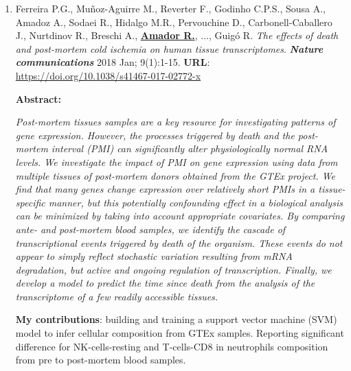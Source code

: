 \begin{enumerate}
\item Ferreira P.G., Muñoz-Aguirre M., Reverter F., Godinho C.P.S., Sousa A., Amadoz A., Sodaei R., Hidalgo  M.R., Pervouchine D., Carbonell-Caballero J., Nurtdinov R., Breschi A., \textbf{\underline{Amador R.}}, ..., Guigó R. \textit{The effects of death and post-mortem cold ischemia on human tissue transcriptomes}. \textit{\textbf{Nature communications}} 2018 Jan; 9(1):1-15. \newline\newline
\textbf{URL}: \url{https://doi.org/10.1038/s41467-017-02772-x}  
\begin{center}
\textbf{Abstract:}
\end{center}
\textit{Post-mortem tissues samples are a key resource for investigating patterns of gene expression. However, the processes triggered by death and the post-mortem interval (PMI) can significantly alter physiologically normal RNA levels. We investigate the impact of PMI on gene expression using data from multiple tissues of post-mortem donors obtained from the GTEx project. We find that many genes change expression over relatively short PMIs in a tissue-specific manner, but this potentially confounding effect in a biological analysis can be minimized by taking into account appropriate covariates. By comparing ante- and post-mortem blood samples, we identify the cascade of transcriptional events triggered by death of the organism. These events do not appear to simply reflect stochastic variation resulting from mRNA degradation, but active and ongoing regulation of transcription. Finally, we develop a model to predict the time since death from the analysis of the transcriptome of a few readily accessible tissues.}

\textbf{My contributions}: building and training a support vector machine (SVM) model to infer cellular composition from GTEx samples. Reporting significant difference for NK-cells-resting and T-cells-CD8 in neutrophils composition from pre to post-mortem blood samples. 


\end{enumerate}
